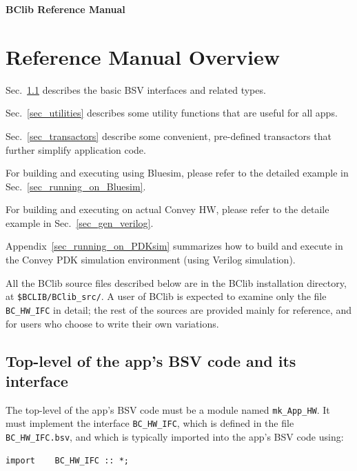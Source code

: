 \documentclass[twoside,letterpaper,11pt]{article}
\begin{document}

\newpage

\begin{center}
{\LARGE\bf BClib Reference Manual}
\end{center}

\vspace*{1cm}


\section{Reference Manual Overview}

\label{sec_ref_man}

Sec.~\ref{sec_bsv_ifcs} describes the basic BSV interfaces and
related types.

Sec.~\ref{sec_utilities} describes some utility functions that are
useful for all apps.

Sec.~\ref{sec_transactors} describe some convenient, pre-defined
transactors that further simplify application code.

For building and executing using Bluesim, please refer to the detailed
example in Sec.~\ref{sec_running_on_Bluesim}.

For building and executing on actual Convey HW, please refer to the
detaile example in Sec.~\ref{sec_gen_verilog}.

Appendix~\ref{sec_running_on_PDKsim} summarizes how to build and
execute in the Convey PDK simulation environment (using Verilog
simulation).

All the BClib source files described below are in the BClib
installation directory, at \verb|$BCLIB/BClib_src/|.  A user of BClib
is expected to examine only the file \verb|BC_HW_IFC| in detail; the
rest of the sources are provided mainly for reference, and for users
who choose to write their own variations.


\subsection{Top-level of the app's BSV code and its interface}

\label{sec_bsv_ifcs}

The top-level of the app's BSV code must be a module named
\verb|mk_App_HW|.  It must implement the interface \verb|BC_HW_IFC|,
which is defined in the file \verb|BC_HW_IFC.bsv|, and which is
typically imported into the app's BSV code using:
\begin{Verbatim}[frame=single]
import    BC_HW_IFC :: *;
\end{Verbatim}
\end{document}
